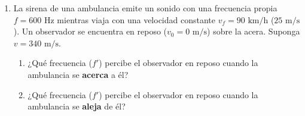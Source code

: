 \documentclass[11pt, letterpaper]{article}
\newif\ifshowanswers
\newcommand{\answer}[1]{%
	\ifshowanswers
	\par\vspace{0.15cm}
	\begin{tcolorbox}[colback=blue!5!white, colframe=blue!60!white, arc=1mm, boxrule=0.5pt, title=\textbf{\footnotesize SOLUCIÓN PASO A PASO (DOCENTE)}]
		\color{blue!80!black}\footnotesize #1
	\end{tcolorbox}
	\par\vspace{0.15cm}
	\else
	\par\vspace{0.3cm}
	\fi
}
\begin{document}
\begin{enumerate}[leftmargin=*, itemsep=0.8cm]
		\item  La sirena de una ambulancia emite un sonido con una frecuencia propia $f = 600\text{ Hz}$ mientras viaja con una velocidad constante $v_f = 90\text{ km/h}$ ($25\text{ m/s}$). Un observador se encuentra en reposo ($v_0 = 0\text{ m/s}$) sobre la acera. Suponga $v = 340\text{ m/s}$.
		\begin{enumerate}[label=\alph*), itemsep=0.2cm]
			\item ¿Qué frecuencia ($f'$) percibe el observador en reposo cuando la ambulancia se \textbf{acerca} a él?
			\item ¿Qué frecuencia ($f'$) percibe el observador en reposo cuando la ambulancia se \textbf{aleja} de él?
		\end{enumerate}
		\answer{
			\textbf{a) Cuando la fuente se acerca al observador en reposo ($v_0 = 0\text{ m/s}$, $v_f$ se toma negativa en la ecuación VIII):}
			\[ f' = f \cdot \left(\frac{v \pm v_0}{v - v_f}\right) = 600\text{ Hz} \cdot \left(\frac{340 + 0}{340 - 25}\right) = 600 \cdot \left(\frac{340}{315}\right) \approx 600 \cdot (1,07937) \approx \mathbf{647,62\text{ Hz}} \]
			\textbf{b) Cuando la fuente se aleja del observador en reposo ($v_0 = 0\text{ m/s}$, $v_f$ se toma positiva en la ecuación VIII):}
			\[ f' = f \cdot \left(\frac{v \pm v_0}{v + v_f}\right) = 600\text{ Hz} \cdot \left(\frac{340 + 0}{340 + 25}\right) = 600 \cdot \left(\frac{340}{365}\right) \approx 600 \cdot (0,93151) \approx \mathbf{558,90\text{ Hz}} \]
		}
		

\end{enumerate}
\end{document}
